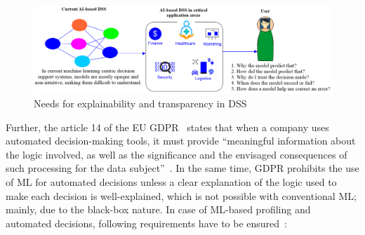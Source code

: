 \begin{figure}[h]
	\centering
	\includegraphics[scale=0.8]{images/why_xai.png}	
    \caption{Needs for explainability and transparency in DSS}	
	\label{fig:need_for_xai}
\end{figure}


\hspace*{3.5mm} Further, the article 14 of the EU GDPR~\cite{kaminski2019right} states that when a company uses automated decision-making tools, it must provide ``meaningful information about the logic involved, as well as the significance and the envisaged consequences of such processing for the data subject”~\cite{kaminski2019right}. In the same time, GDPR prohibits the use of ML for automated decisions unless a clear explanation of the logic used to make each decision is well-explained, which is not possible with conventional ML; mainly, due to the black-box nature. In case of ML-based profiling and automated decisions, following requirements have to be ensured~\cite{doshi2017towards}: 

